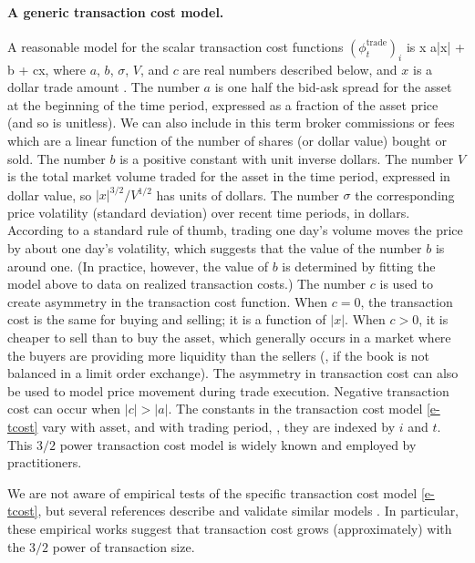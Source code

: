 \documentclass[openany]{article}  %
\newcommand{\trcost}{\phi^\mathrm{trade}}
\begin{document}
\paragraph{A generic transaction cost model.}
A reasonable model for the scalar transaction cost functions $(\trcost_t)_i$ is
\BEQ\label{e-tcost}
x \mapsto a|x| + b \sigma {} + cx,
\EEQ
where $a$, $b$, $\sigma$, $V$, and $c$ are real numbers described below,
and $x$ is a dollar trade amount \cite{grinold1999active}.
The number $a$ is one half the bid-ask spread for the asset
at the beginning of the time period, expressed as a fraction of the
asset price (and so is unitless).
We can also include in this term
broker commissions or fees which are a linear
function of the number of shares (or dollar value) bought or sold.
The number $b$ is a positive constant with unit inverse dollars.
The number $V$ is the total market volume traded
for the asset in the time period, expressed in dollar value,
so $|x|^{3/2}/V^{1/2}$ has units of dollars.
The number $\sigma$ the corresponding price volatility
(standard deviation) over recent time periods, in dollars.
According to a standard rule of thumb,
trading one day's volume moves the
price by about one day's volatility, which suggests that the value of
the number $b$ is around one.
(In practice, however, the value of $b$ is determined
by fitting the model above to data on realized transaction costs.)
The number $c$ is used to create asymmetry in the transaction
cost function.  When $c=0$, the transaction cost is the same for
buying and selling; it is a function of $|x|$.  When $c>0$,
it is cheaper to sell than to buy the asset,
which generally occurs in a market where
the buyers are providing more liquidity than the sellers
(\eg, if the book is not balanced in a limit order exchange).
The asymmetry in transaction cost can also be used to model
price movement during trade execution.
Negative transaction cost can occur when $|c| > |a|$.
The constants in the transaction cost model \eqref{e-tcost} vary with asset,
and with trading period, \ie, they are indexed by $i$ and $t$.
This $3/2$ power transaction cost model is widely known and employed by practitioners.

We are not aware of empirical tests of the specific transaction cost 
model \eqref{e-tcost},
but several references describe and validate similar 
models \cite{lillo2003econophysics, moro2009market, bershova2013non, gomes2015market}.
In particular, these empirical works
suggest that transaction cost grows (approximately) with the 
$3/2$ power of transaction size.
\end{document}
